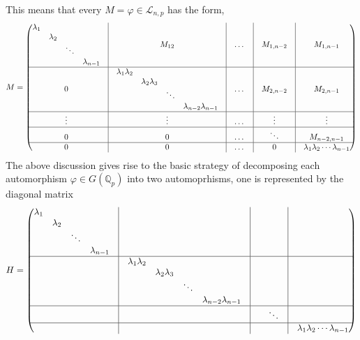 \documentclass[12pt]{article}
\begin{document}
This means that every $M=\varphi\in\mathcal{L}_{n,p}$ has the form,$$M=\begin{pmatrix}
\begin{matrix}\lambda_1 & & &\\
& \lambda_2 & &\\
& & \ddots &\\
& & & \lambda_{n-1}\\
\end{matrix} & \vline & M_{12}&\vline & \dots& \vline & M_{1,n-2} & \vline&M_{1,n-1}\\
\hline
0 & \vline & \begin{matrix}\lambda_1\lambda_2 & & &\\
& \lambda_2\lambda_3 & &\\
& & \ddots &\\
& & & \lambda_{n-2}\lambda_{n-1}\\
\end{matrix}&\vline & \dots &\vline & M_{2,n-2} &\vline& M_{2,n-1}\\
\hline
\vdots & \vline & \vdots&\vline & \dots &\vline & \vdots &\vline& \vdots\\
\hline
0 & \vline & 0&\vline & \dots &\vline & \ddots &\vline& M_{n-2,n-1}\\
\hline
0 & \vline & 0 &\vline & \dots &\vline & 0 &\vline& \lambda_1\lambda_2\cdots\lambda_{n-1}\\
\end{pmatrix}$$
The above discussion gives rise to the basic strategy of decomposing each automorphism $\varphi\in G(\mathbb{Q}_p)$ into two automoprhisms, one is represented by the diagonal matrix\[H=\begin{pmatrix}
\begin{matrix}\lambda_1 & & &\\
& \lambda_2 & &\\
& & \ddots &\\
& & & \lambda_{n-1}\\
\end{matrix} & \vline & &\vline &  &  & \vline&\\
\hline
 & \vline & \begin{matrix}\lambda_1\lambda_2 & & &\\
& \lambda_2\lambda_3 & &\\
& & \ddots &\\
& & & \lambda_{n-2}\lambda_{n-1}\\
\end{matrix}&\vline &  & &\vline& \\
\hline
 & \vline & &\vline &  & \ddots &\vline& \\
\hline
 & \vline &  &\vline &  &  &\vline& \lambda_1\lambda_2\cdots\lambda_{n-1}\\
\end{pmatrix}
\]
\end{document}
